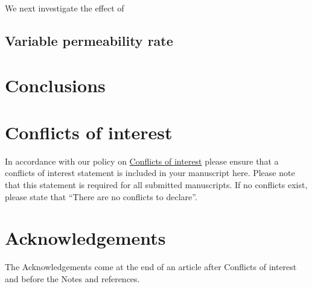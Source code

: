 \documentclass[twoside,twocolumn,9pt]{article}
\begin{document}
We next investigate the effect of




\subsection{Variable permeability rate}

\section{Conclusions}

\section*{Conflicts of interest}
In accordance with our policy on
\href{http://www.rsc.org/journals-books-databases/journal-authors-reviewers/author-responsibilities/#code-of-conduct}{Conflicts
of interest} please ensure that a conflicts of interest statement is
included in your manuscript here.  Please note that this statement is
required for all submitted manuscripts.  If no conflicts exist, please
state that ``There are no conflicts to declare''.

\section*{Acknowledgements}
The Acknowledgements come at the end of an article after Conflicts of interest and before the Notes and references.



\balance

\end{document}

